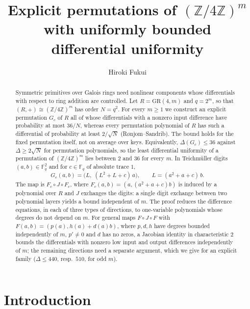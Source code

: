 \documentclass[11pt]{amsart}
\title[Bounded differential uniformity on $(\mathbb Z/4\mathbb Z)^m$]{Explicit permutations of $(\mathbb Z/4\mathbb Z)^m$\\ with uniformly bounded differential uniformity}
\author{Hiroki Fukui}
\theoremstyle{definition}
\newcommand{\Fq}{\mathbb{F}_q}
\newcommand{\GR}{\mathrm{GR}}
\begin{document}
\begin{abstract}
Symmetric primitives over Galois rings need nonlinear components whose differentials with respect to ring addition are
controlled. Let $R=\GR(4,m)$ and $q=2^m$, so that $(R,+)\cong(\mathbb Z/4\mathbb Z)^m$ has order $N=q^2$. For every $m\ge1$ we
construct an explicit permutation $G_c$ of $R$ all of whose differentials with a nonzero input difference have probability at most
$36/N$, whereas every permutation polynomial of $R$ has such a differential of probability at least $2/\sqrt N$
(R{\o}njom--Sandrib). The bound holds for the fixed permutation itself, not on average over keys. Equivalently, $\Delta(G_c)\le36$
against $\Delta\ge2\sqrt N$ for permutation polynomials, so the least differential uniformity of a permutation of
$(\mathbb Z/4\mathbb Z)^m$ lies between $2$ and $36$ for every $m$. In Teichm\"uller digits $(a,b)\in\Fq^2$ and for $c\in\Fq$ of
absolute trace $1$,
\[
G_c(a,b)=\bigl(L,\;(L^2+L+c)\,a\bigr),\qquad L=(a^2+a+c)\,b .
\]
The map is $F_c\circ J\circ F_c$, where $F_c(a,b)=(a,(a^2+a+c)b)$ is induced by a polynomial over $R$ and $J$ exchanges the
digits: a single digit exchange between two polynomial layers yields a bound independent of $m$.
The proof reduces the difference equations, in each of three types of directions, to one-variable polynomials whose degrees do
not depend on $m$. For general maps $F\circ J\circ F$ with $F(a,b)=(p(a),h(a)+d(a)b)$, where $p,d,h$ have degrees bounded
independently of $m$, $p'\ne0$ and $d$ has no zeros, a Jacobian identity in characteristic $2$ bounds the differentials with
nonzero low input and output differences independently of $m$; the remaining directions need a separate argument, which we give
for an explicit family ($\Delta\le440$, resp.\ $510$, for odd $m$).
\end{abstract}
\maketitle

\section{Introduction}
\end{document}
